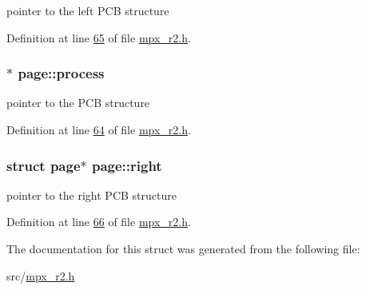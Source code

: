 pointer to the left PCB structure 



Definition at line \hyperlink{mpx__r2_8h_source_l00065}{65} of file \hyperlink{mpx__r2_8h_source}{mpx\_\-r2.h}.

\hypertarget{structpage_af3cc0e1320b79159b230f154f1a95f0d}{
\subsubsection[{process}]{$\ast$ {\bf page::process}}}
\label{structpage_af3cc0e1320b79159b230f154f1a95f0d}


pointer to the PCB structure 



Definition at line \hyperlink{mpx__r2_8h_source_l00064}{64} of file \hyperlink{mpx__r2_8h_source}{mpx\_\-r2.h}.

\hypertarget{structpage_a72bca7218659f6f6e4e94cc0bacc26d1}{
\subsubsection[{right}]{\setlength{\rightskip}{0pt plus 5cm}struct {\bf page}$\ast$ {\bf page::right}}}
\label{structpage_a72bca7218659f6f6e4e94cc0bacc26d1}


pointer to the right PCB structure 



Definition at line \hyperlink{mpx__r2_8h_source_l00066}{66} of file \hyperlink{mpx__r2_8h_source}{mpx\_\-r2.h}.



The documentation for this struct was generated from the following file:\begin{DoxyCompactItemize}
\item 
src/\hyperlink{mpx__r2_8h}{mpx\_\-r2.h}\end{DoxyCompactItemize}
